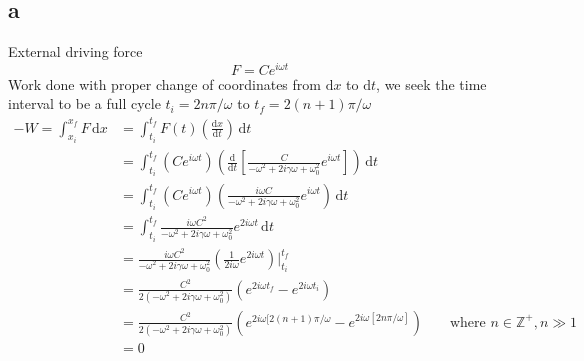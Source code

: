 \documentclass[12pt,letter]{article}
\begin{document}
\subsection*{a} 
External driving force 
\[ F = C e^{i \omega t}
\]
Work done with proper change of coordinates from $\mathrm{d} x$ to $\mathrm{d} t$, we seek the time interval to be a full cycle $ t_i = 2 n \pi / \omega$ to $t_f = 2 (n+1) \pi / \omega$
\begin{align*} 
- W = 
	\int_{x_i}^{x_f}  F \, \mathrm{d} x &=
\int_{t_i}^{t_f}  F(t) \left(\frac{\mathrm{d} x}{\mathrm{d} t}\right) \, \mathrm{d} t \\
&= 
\int_{t_i}^{t_f} (C e^{i \omega t}) \left(\frac{\mathrm{d} }{\mathrm{d} t} 
\left[\frac{C}{- \omega^2 + 2 i \gamma \omega + \omega_0^2} e^{i \omega t}
\right]\right)  \, \mathrm{d} t \\ &=  
\int_{t_i}^{t_f} (C e^{i \omega t}) \left(
\frac{ i \omega C}{- \omega^2 + 2 i \gamma \omega + \omega_0^2} e^{i \omega t}
\right)  \, \mathrm{d} t \\ 
&= 
\int_{t_i}^{t_f} 
\frac{ i \omega C^2 }{- \omega^2 + 2 i \gamma \omega + \omega_0^2} 
e^{2 i \omega t }
\, \mathrm{d} t \\ &=
\frac{ i \omega C^2 }{- \omega^2 + 2 i \gamma \omega + \omega_0^2} 
\left(
\frac{1}{2 i \omega } e^{2 i \omega t}   
\right)\Biggr\rvert_{t_i}^{t_f}  
\\		   &= 
\frac{ C^2 }{ 2 (- \omega^2 + 2 i \gamma \omega + \omega_0^2)} 
\left(
e^{2 i \omega t_f }- e^{ 2 i \omega t_i}   
\right) 
\\		   &= 
\frac{ C^2 }{ 2 (- \omega^2 + 2 i \gamma \omega + \omega_0^2)} 
\left(
	e^{2 i \omega [2(n+1) \pi / \omega }- e^{ 2 i \omega [2 n \pi / \omega ]}   
\right)
		   && \text{ where $n \in \mathbb{Z}^{+}, n \gg 1$}  \\
		   &= 0 \\
\end{align*} 
\end{document}
